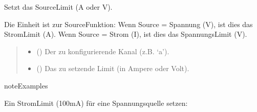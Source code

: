 \documentclass[letterpaper,10pt,english]{sphinxmanual}
\begin{document}
\begin{fulllineitems}
\begin{fulllineitems}
\begin{quote}
\begin{description}
\begin{itemize}
\end{itemize}

\end{description}\end{quote}

\end{fulllineitems}


\begin{fulllineitems}
\label{\detokenize{modulab/smu_manager:modules.smu.SmuManager.SmuManager.set_source_limit}}
\pysigstartsignatures
\pysiglinewithargsret
{}
{\sphinxparamcomma {}}
{}
\pysigstopsignatures
\sphinxAtStartPar
Setzt das Source\sphinxhyphen{}Limit (A oder V).

\sphinxAtStartPar
Die Einheit ist  zur Source\sphinxhyphen{}Funktion:
\sphinxhyphen{} Wenn Source = Spannung (V), ist dies das Strom\sphinxhyphen{}Limit (A).
\sphinxhyphen{} Wenn Source = Strom (I), ist dies das Spannungs\sphinxhyphen{}Limit (V).
\begin{quote}\begin{description}
\begin{itemize}
\item {} 
\sphinxAtStartPar
{} () \textendash{} Der zu konfigurierende Kanal (z.B. ‘a’).

\item {} 
\sphinxAtStartPar
{} () \textendash{} Das zu setzende Limit (in Ampere oder Volt).

\end{itemize}

\end{description}\end{quote}

\begin{sphinxadmonition}{note}{Examples}

\sphinxAtStartPar
Ein Strom\sphinxhyphen{}Limit (100mA) für eine Spannungsquelle setzen:

\begin{sphinxVerbatim}[commandchars=\\\{\}]


\end{sphinxVerbatim}
\end{sphinxadmonition}
\end{fulllineitems}
\end{fulllineitems}
\end{document}
